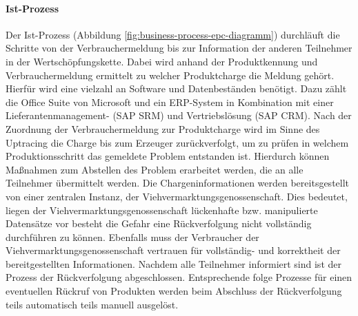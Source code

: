 \paragraph{Ist-Prozess}
Der Ist-Prozess (Abbildung \ref{fig:business-process-epc-diagramm}) durchläuft die Schritte von der Verbrauchermeldung bis zur Information der anderen Teilnehmer in der Wertschöpfungskette. Dabei wird anhand der Produktkennung und Verbrauchermeldung ermittelt zu welcher Produktcharge die Meldung gehört. Hierfür wird eine vielzahl an Software und Datenbeständen benötigt. Dazu zählt die Office Suite von Microsoft und ein ERP-System in Kombination mit einer Lieferantenmanagement- (SAP SRM) und Vertriebslösung (SAP CRM). Nach der Zuordnung der Verbrauchermeldung zur Produktcharge wird im Sinne des Uptracing die Charge bis zum Erzeuger zurückverfolgt, um zu prüfen in welchem Produktionsschritt das gemeldete Problem entstanden ist. Hierdurch können Maßnahmen zum Abstellen des Problem erarbeitet werden, die an alle Teilnehmer übermittelt werden. Die Chargeninformationen werden bereitsgestellt von einer zentralen Instanz, der Viehvermarktungsgenossenschaft. Dies bedeutet, liegen der Viehvermarktungsgenossenschaft lückenhafte bzw. manipulierte Datensätze vor besteht die Gefahr eine Rückverfolgung nicht vollständig durchführen zu können. Ebenfalls muss der Verbraucher der Viehvermarktungsgenossenschaft vertrauen für vollständig- und korrektheit der bereitgestellten Informationen. Nachdem alle Teilnehmer informiert sind ist der Prozess der Rückverfolgung abgeschlossen. Entsprechende folge Prozesse für einen eventuellen Rückruf von Produkten werden beim Abschluss der Rückverfolgung teils automatisch teils manuell ausgelöst.

